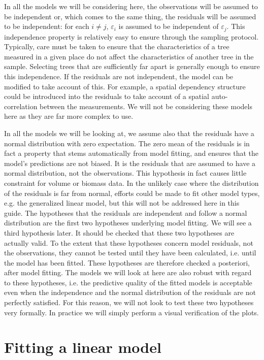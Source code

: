 In all the models we will be considering here, the observations will be assumed to be independent or, which comes to the same thing, the residuals will be assumed to be independent: for each $i\neq j$, $\varepsilon_i$ is assumed to be independent of $\varepsilon_j$. This independence property is relatively easy to ensure through the sampling protocol. Typically, care must be taken to ensure that the characteristics of a tree measured in a given place do not affect the characteristics of another tree in the sample. Selecting trees that are sufficiently far apart is generally enough to ensure this independence. If the residuals are not independent, the model can be modified to take account of this. For example, a spatial dependency structure could be introduced into the residuals to take account of a spatial auto-correlation between the measurements. We will not be considering these models here as they are far more complex to use.


In all the models we will be looking at, we assume also that the residuals have a normal distribution with zero expectation. The zero mean of the residuals is in fact a property that stems automatically from model fitting, and ensures that the model's predictions are not biased. It is the residuals that are assumed to have a normal distribution, not the observations. This hypothesis in fact causes little constraint for volume or biomass data. In the unlikely case where the distribution of the residuals is far from normal, efforts could be made to fit other model types, e.g. the generalized linear model, but this will not be addressed here in this guide.
The hypotheses that the residuals are independent and follow a normal distribution are the first two hypotheses underlying model fitting. We will see a third hypothesis later. It should be checked that these two hypotheses are actually valid. To the extent that these hypotheses concern model residuals, not the observations, they cannot be tested until they have been calculated, i.e. until the model has been fitted. These hypotheses are therefore checked a posteriori, after model fitting. The models we will look at here are also robust with regard to these hypotheses, i.e. the predictive quality of the fitted models is acceptable even when the independence and the normal distribution of the residuals are not perfectly satisfied. For this reason, we will not look to test these two hypotheses very formally. In practice we will simply perform a visual verification of the plots.

\section{Fitting a linear model}


